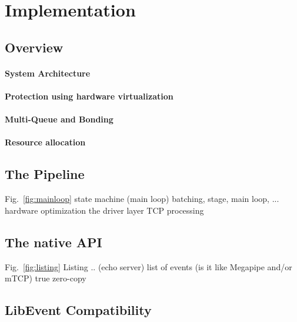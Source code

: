 
\section{Implementation}
\label{sec:impl}

\subsection{Overview}

\paragraph{System Architecture}



\paragraph{Protection using hardware virtualization}


\paragraph{Multi-Queue and Bonding}


%


\paragraph{Resource allocation}


\subsection{The \ix Pipeline}

%

\todo   Fig.~\ref{fig:mainloop} state machine (main loop)
\todo   batching, stage, main loop, ...
\todo   hardware optimization
\todo   the driver layer
\todo   TCP processing
     
\subsection{The \ix native API}


\todo Fig.~\ref{fig:listing} Listing .. (echo server)
\todo list of events (is it like Megapipe and/or mTCP)
\todo  true zero-copy

\subsection{LibEvent Compatibility}

